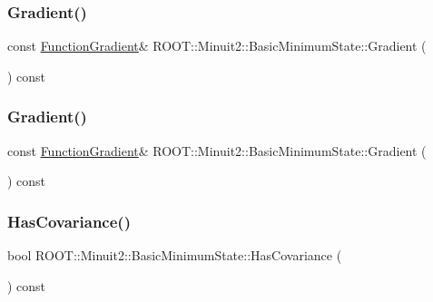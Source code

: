 \subsubsection{\texorpdfstring{Gradient()}{Gradient()}\hspace{0.1cm}{\footnotesize\ttfamily [1/2]}}
{\footnotesize\ttfamily const \mbox{\hyperlink{classROOT_1_1Minuit2_1_1FunctionGradient}{Function\+Gradient}}\& R\+O\+O\+T\+::\+Minuit2\+::\+Basic\+Minimum\+State\+::\+Gradient (\begin{DoxyParamCaption}{ }\end{DoxyParamCaption}) const\hspace{0.3cm}{\ttfamily [inline]}}

\mbox{\label{classROOT_1_1Minuit2_1_1BasicMinimumState_a45b6c728054b409349fb2f6f725a8ab6}} 
\subsubsection{\texorpdfstring{Gradient()}{Gradient()}\hspace{0.1cm}{\footnotesize\ttfamily [2/2]}}
{\footnotesize\ttfamily const \mbox{\hyperlink{classROOT_1_1Minuit2_1_1FunctionGradient}{Function\+Gradient}}\& R\+O\+O\+T\+::\+Minuit2\+::\+Basic\+Minimum\+State\+::\+Gradient (\begin{DoxyParamCaption}{ }\end{DoxyParamCaption}) const\hspace{0.3cm}{\ttfamily [inline]}}

\mbox{\label{classROOT_1_1Minuit2_1_1BasicMinimumState_a9d43155058c576759d062561d77b3e1d}} 
\subsubsection{\texorpdfstring{HasCovariance()}{HasCovariance()}\hspace{0.1cm}{\footnotesize\ttfamily [1/2]}}
{\footnotesize\ttfamily bool R\+O\+O\+T\+::\+Minuit2\+::\+Basic\+Minimum\+State\+::\+Has\+Covariance (\begin{DoxyParamCaption}{ }\end{DoxyParamCaption}) const\hspace{0.3cm}{\ttfamily [inline]}}

